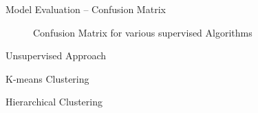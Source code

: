 \documentclass[11pt]{beamer}
\begin{document}
\begin{frame}{Model Evaluation -- Confusion Matrix}
	\begin{figure}[htp]
		\centering
		\caption{Confusion Matrix for various supervised Algorithms}
		\label{figur2}
		
	\end{figure}
\end{frame}


\begin{frame}{Unsupervised Approach}
	\begin{multicols}{2}
		K-means Clustering
		 
		\columnbreak
		Hierarchical Clustering
\end{multicols}
\end{frame}
\end{document}
